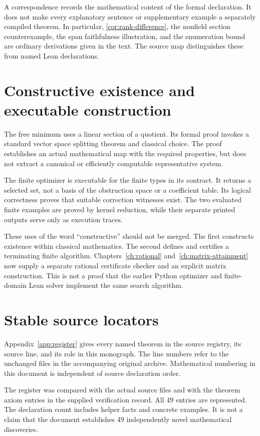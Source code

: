 \documentclass[11pt,letterpaper,oneside,openany]{book}
\theoremstyle{quiet}
\begin{document}
A correspondence records the mathematical content of the formal declaration. It does not make every explanatory sentence or supplementary example a separately compiled theorem. In particular, \cref{cor:rank-difference}, the nonfield section counterexample, the span faithfulness illustration, and the enumeration bound are ordinary derivations given in the text. The source map distinguishes these from named Lean declarations.

\section{Constructive existence and executable construction}
The free minimum uses a linear section of a quotient. Its formal proof invokes a standard vector space splitting theorem and classical choice. The proof establishes an actual mathematical map with the required properties, but does not extract a canonical or efficiently computable representative system.

The finite optimizer is executable for the finite types in its contract. It returns a selected set, not a basis of the obstruction space or a coefficient table. Its logical correctness proves that suitable correction witnesses exist. The two evaluated finite examples are proved by kernel reduction, while their separate printed outputs serve only as execution traces.

These uses of the word ``constructive'' should not be merged. The first constructs existence within classical mathematics. The second defines and certifies a terminating finite algorithm. Chapters~\ref{ch:rational} and~\ref{ch:matrix-attainment} now supply a separate rational certificate checker and an explicit matrix construction. This is not a proof that the earlier Python optimizer and finite-domain Lean solver implement the same search algorithm.

\section{Stable source locators}
Appendix~\ref{app:register} gives every named theorem in the source registry, its source line, and its role in this monograph. The line numbers refer to the unchanged files in the accompanying original archive. Mathematical numbering in this document is independent of source declaration order.

The register was compared with the actual source files and with the theorem axiom entries in the supplied verification record. All 49 entries are represented. The declaration count includes helper facts and concrete examples. It is not a claim that the document establishes 49 independently novel mathematical discoveries.
\end{document}
